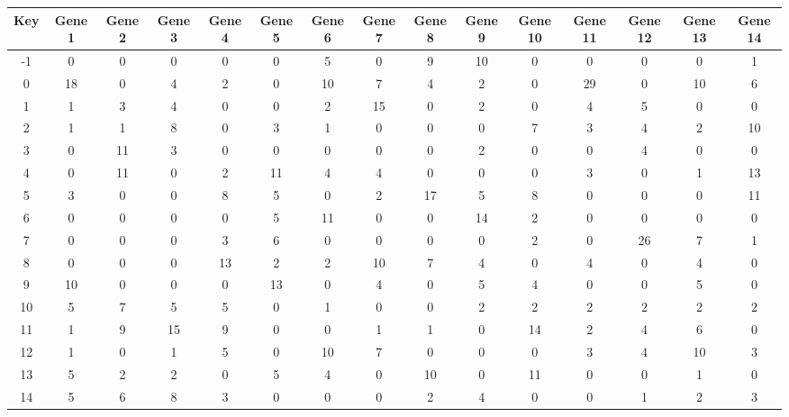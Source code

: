\begin{tabular}{|c|c|c|c|c|c|c|c|c|c|c|c|c|c|c|}
\hline
Key & Gene 1 & Gene 2 & Gene 3 & Gene 4 & Gene 5 & Gene 6 & Gene 7 & Gene 8 & Gene 9 & Gene 10 & Gene 11 & Gene 12 & Gene 13 & Gene 14 \\
\hline
-1 & 0 & 0 & 0 & 0 & 0 & 5 & 0 & 9 & 10 & 0 & 0 & 0 & 0 & 1 \\
0 & 18 & 0 & 4 & 2 & 0 & 10 & 7 & 4 & 2 & 0 & 29 & 0 & 10 & 6 \\
1 & 1 & 3 & 4 & 0 & 0 & 2 & 15 & 0 & 2 & 0 & 4 & 5 & 0 & 0 \\
2 & 1 & 1 & 8 & 0 & 3 & 1 & 0 & 0 & 0 & 7 & 3 & 4 & 2 & 10 \\
3 & 0 & 11 & 3 & 0 & 0 & 0 & 0 & 0 & 2 & 0 & 0 & 4 & 0 & 0 \\
4 & 0 & 11 & 0 & 2 & 11 & 4 & 4 & 0 & 0 & 0 & 3 & 0 & 1 & 13 \\
5 & 3 & 0 & 0 & 8 & 5 & 0 & 2 & 17 & 5 & 8 & 0 & 0 & 0 & 11 \\
6 & 0 & 0 & 0 & 0 & 5 & 11 & 0 & 0 & 14 & 2 & 0 & 0 & 0 & 0 \\
7 & 0 & 0 & 0 & 3 & 6 & 0 & 0 & 0 & 0 & 2 & 0 & 26 & 7 & 1 \\
8 & 0 & 0 & 0 & 13 & 2 & 2 & 10 & 7 & 4 & 0 & 4 & 0 & 4 & 0 \\
9 & 10 & 0 & 0 & 0 & 13 & 0 & 4 & 0 & 5 & 4 & 0 & 0 & 5 & 0 \\
10 & 5 & 7 & 5 & 5 & 0 & 1 & 0 & 0 & 2 & 2 & 2 & 2 & 2 & 2 \\
11 & 1 & 9 & 15 & 9 & 0 & 0 & 1 & 1 & 0 & 14 & 2 & 4 & 6 & 0 \\
12 & 1 & 0 & 1 & 5 & 0 & 10 & 7 & 0 & 0 & 0 & 3 & 4 & 10 & 3 \\
13 & 5 & 2 & 2 & 0 & 5 & 4 & 0 & 10 & 0 & 11 & 0 & 0 & 1 & 0 \\
14 & 5 & 6 & 8 & 3 & 0 & 0 & 0 & 2 & 4 & 0 & 0 & 1 & 2 & 3 \\
\hline
\end{tabular}